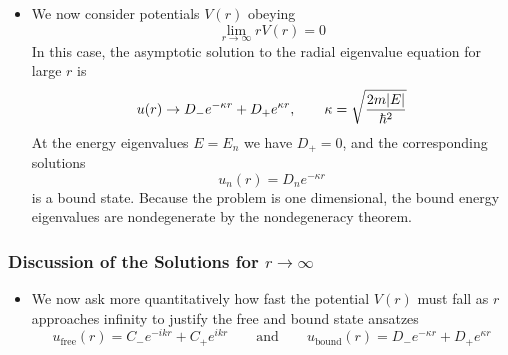\documentclass[11pt, a4paper]{article}
\newcommand{\eqtext}[1]{\qquad \text{#1} \qquad}
\begin{document}
\begin{itemize}
	\item We now consider potentials $ V(r) $ obeying
	\begin{equation*}
		\lim_{r \to \infty}rV(r) = 0
	\end{equation*}
	In this case, the asymptotic solution to the radial eigenvalue equation for large $ r $ is
	\begin{equation*}
		u(r) \to D_{-}e^{-\kappa r} + D_{+}e^{\kappa r}, \qquad \kappa = \sqrt{\frac{2m\abs{E}}{\hbar^{2}}}
	\end{equation*}
	At the energy eigenvalues $ E = E_{n} $ we have $ D_{+} = 0 $, and the corresponding solutions
	\begin{equation*}
		u_{n}(r) = D_{n}e^{-\kappa r}
	\end{equation*}
	is a bound state. Because the problem is one dimensional, the bound energy eigenvalues are nondegenerate by the nondegeneracy theorem.
	
\end{itemize}

\subsubsection{Discussion of the Solutions for $ r \to \infty $}
\begin{itemize}
	\item We now ask more quantitatively how fast the potential $ V(r) $ must fall as $ r $ approaches infinity to justify the free and bound state ansatzes
	\begin{equation*}
		u_{\text{free}}(r) = C_{-}e^{-i k r} + C_{+}e^{i k r}\eqtext{and} u_{\text{bound}}(r) = D_{-}e^{-\kappa r} + D_{+}e^{\kappa r}
	\end{equation*}
\end{itemize}
\end{document}
